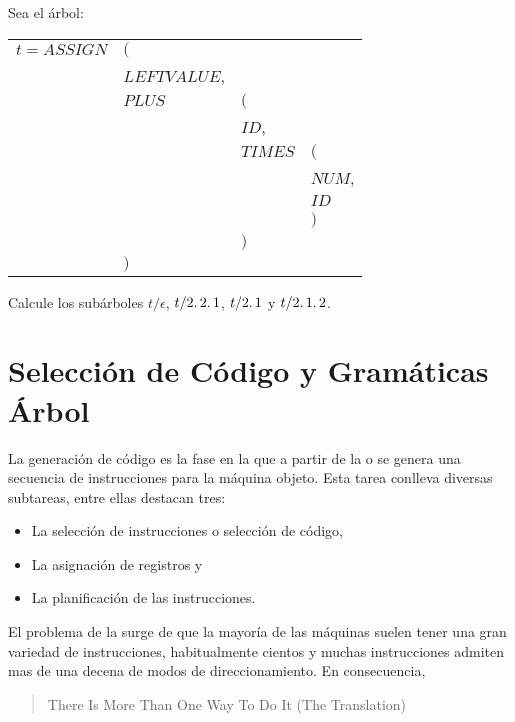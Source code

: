 \begin{exercise}
Sea el árbol:

\vspace{0.5cm}
\begin{tabular}{llll}
$t = ASSIGN$  & $($          &         &\\
          & $LEFTVALUE$, &   &\\
          & $PLUS$       & $($     &\\
          &              & $ID$,   & \\
          &              & $TIMES$ & $($\\
          &              &         & $NUM$,\\
          &              &         & $ID$\\
          &              &         & $)$\\
          &              & $)$     &\\
          & $)$          &         &
\end{tabular}

\vspace{0.5cm}
Calcule los subárboles $t/\epsilon$, $t/2\ldotp2\ldotp1$, $t/2\ldotp1$ y $t/2\ldotp1\ldotp2$.
\end{exercise}


\section{Selección de Código y Gramáticas Árbol}
\label{section:selecciondecodigo}
La generación de código es la fase en la que a partir de la 
 o  se genera 
una secuencia de instrucciones para la máquina objeto.
Esta tarea conlleva diversas subtareas, entre ellas destacan
tres: 
\begin{itemize}
\item
La selección de instrucciones o selección de código, 
\item
La asignación de registros
y 
\item
La planificación de las instrucciones.
\end{itemize}

El problema de la  surge de que
la mayoría de las máquinas suelen tener una gran variedad de instrucciones,
habitualmente cientos y muchas instrucciones admiten mas de una decena de modos de 
direccionamiento.
En consecuencia, 

\begin{center}
\begin{quote}
There Is More Than One Way To Do It (The Translation)
\end{quote}
\end{center}

